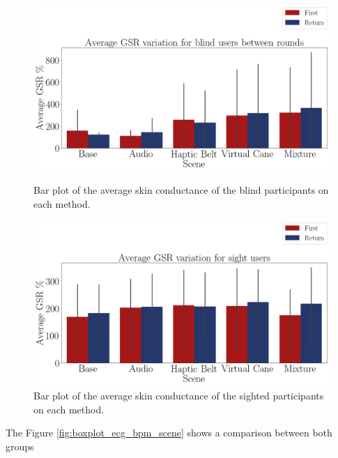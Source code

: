 \begin{figure}[!htb]
    \centering
    \begin{minipage}{\textwidth}
        \centering
        \includegraphics[width = 0.8\linewidth]{Resultados/GSR/Figuras/png/barplot_gsr_avg_scene_blind.png}
        \caption{Bar plot of the average skin conductance of the blind participants on each method.}
        \label{fig:barplot_gsr_scene_blind}
    \end{minipage}
    \begin{minipage}{\textwidth}
        \centering
        \includegraphics[width = 0.8\linewidth]{Resultados/GSR/Figuras/png/barplot_gsr_avg_scene_sight.png}
        \caption{Bar plot of the average skin conductance of the sighted participants on each method.}
        \label{fig:barplot_gsr_scene_sight}
    \end{minipage}
\end{figure}

The Figure \ref{fig:boxplot_ecg_bpm_scene} shows a comparison between both groups


